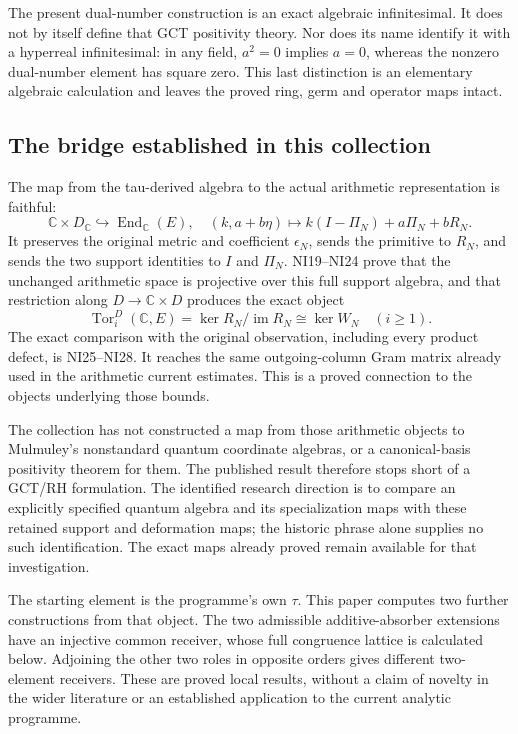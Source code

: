 \documentclass[
]{article}
\begin{document}
The present dual-number construction is an exact algebraic
infinitesimal. It does not by itself define that GCT positivity theory.
Nor does its name identify it with a hyperreal infinitesimal: in any
field, \(a^2=0\) implies \(a=0\), whereas the nonzero dual-number
element has square zero. This last distinction is an elementary
algebraic calculation and leaves the proved ring, germ and operator maps
intact.

\subsection{The bridge established in this
collection}\label{the-bridge-established-in-this-collection}

The map from the tau-derived algebra to the actual arithmetic
representation is faithful: \[
\mathbb C\times D_{\mathbb C}\hookrightarrow\operatorname{End}_{\mathbb C}(E),
\quad(k,a+b\eta)\mapsto k(I-\Pi_N)+a\Pi_N+bR_N.
\tag{LB3}
\] It preserves the original metric and coefficient \(\epsilon_N\),
sends the primitive to \(R_N\), and sends the two support identities to
\(I\) and \(\Pi_N\). NI19--NI24 prove that the unchanged arithmetic
space is projective over this full support algebra, and that restriction
along \(D\to\mathbb C\times D\) produces the exact object \[
\operatorname{Tor}^{D}_i(\mathbb C,E)
=\ker R_N/\operatorname{im}R_N\cong\ker W_N\quad(i\ge1).
\tag{LB4}
\] The exact comparison with the original observation, including every
product defect, is NI25--NI28. It reaches the same outgoing-column Gram
matrix already used in the arithmetic current estimates. This is a
proved connection to the objects underlying those bounds.

The collection has not constructed a map from those arithmetic objects
to Mulmuley's nonstandard quantum coordinate algebras, or a
canonical-basis positivity theorem for them. The published result
therefore stops short of a GCT/RH formulation. The identified research
direction is to compare an explicitly specified quantum algebra and its
specialization maps with these retained support and deformation maps;
the historic phrase alone supplies no such identification. The exact
maps already proved remain available for that investigation.

The starting element is the programme's own \(\tau\). This paper
computes two further constructions from that object. The two admissible
additive-absorber extensions have an injective common receiver, whose
full congruence lattice is calculated below. Adjoining the other two
roles in opposite orders gives different two-element receivers. These
are proved local results, without a claim of novelty in the wider
literature or an established application to the current analytic
programme.
\end{document}
